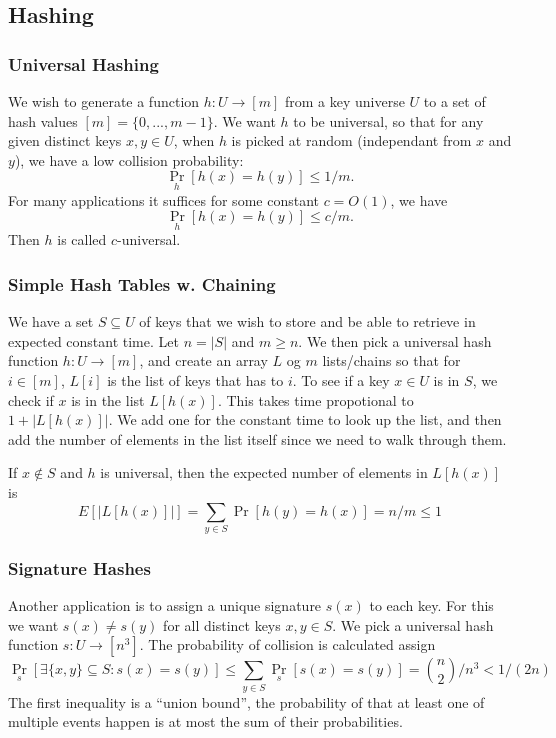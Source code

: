 \subsection{Hashing}

\subsubsection{Universal Hashing}
We wish to generate a function $h : U \rightarrow [m]$ from a key universe $U$
to a set of hash values $[m] = \{ 0, ..., m-1 \}$.  We want $h$ to be universal,
so that for any given distinct keys $x,y \in U$, when $h$ is picked at random
(independant from $x$ and $y$), we have a low collision probability:
\[
  \underset{h}{\Pr}[h(x) = h(y)] \leq 1/m.
\]
For many applications it suffices for some constant $c = O(1)$, we have
\[
  \underset{h}{\Pr}[h(x) = h(y)] \leq c/m.
\]
Then $h$ is called $c$-universal.

\subsubsection{Simple Hash Tables w. Chaining}
We have a set $S \subseteq U$ of keys that we wish to store and be able to
retrieve in expected constant time.  Let $n = |S|$ and $m \geq n$. We then pick
a universal hash function $h : U \rightarrow [m]$, and create an array $L$ og
$m$ lists/chains so that for $i\in[m]$, $L[i]$ is the list of keys that has to
$i$.  To see if a key $x\in U$ is in $S$, we check if $x$ is in the list
$L[h(x)]$. This takes time propotional to $1+|L[h(x)]|$.  We add one for the
constant time to look up the list, and then add the number of elements in the
list itself since we need to walk through them.

If $x \notin S$ and $h$ is universal, then the expected number of elements in
$L[h(x)]$ is
\[
  E[|L[h(x)]|] = \sum_{y \in S} \Pr[h(y) = h(x)] = n/m \leq 1
\]

\subsubsection{Signature Hashes}
Another application is to assign a unique signature $s(x)$ to each key. For this
we want $s(x) \neq s(y)$ for all distinct keys $x,y \in S$.  We pick a universal
hash function $s: U \rightarrow [n^3]$. The probability of collision is
calculated assign
\[
  \underset{s}{\Pr}[\exists\{x,y\}\subseteq S : s(x) = s(y)] \leq \sum_{y\in S}
  \underset{s}{\Pr}[s(x) = s(y)] = \binom{n}{2}/n^3 < 1/(2n)
\]
The first inequality is a ``union bound'', the probability of that at least one
of multiple events happen is at most the sum of their probabilities.


